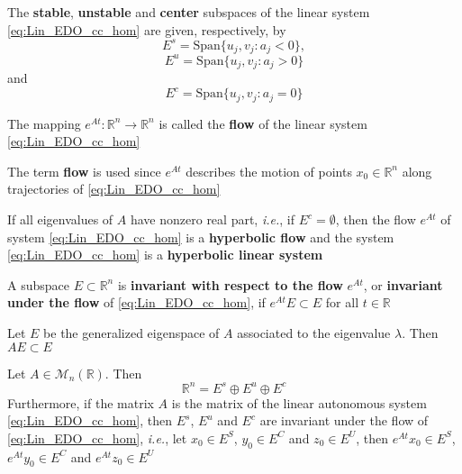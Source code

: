 \documentclass{beamer}
\def\ie{\emph{i.e.}}
\def\defword#1{\textbf{#1}}
\begin{document}
\begin{frame}
\begin{definition}
The \defword{stable}, \defword{unstable} and \defword{center} subspaces of the linear system \eqref{eq:Lin_EDO_cc_hom} are given, respectively, by
\[
E^s=\textrm{Span}\{u_j,v_j:a_j<0\},
\]
\[
E^u=\textrm{Span}\{u_j,v_j:a_j>0\}
\]
and
\[
E^c=\textrm{Span}\{u_j,v_j:a_j=0\}
\]
\end{definition}
\end{frame}

\begin{frame}
\begin{definition}
The mapping $e^{At}:\mathbb{R}^n\to\mathbb{R}^n$ is called the \defword{flow} of the linear system \eqref{eq:Lin_EDO_cc_hom}
\end{definition}
The term \defword{flow} is used since $e^{At}$ describes the motion of points $x_0\in\mathbb{R}^n$ along trajectories of \eqref{eq:Lin_EDO_cc_hom}
\begin{definition}
If all eigenvalues of $A$ have nonzero real part, \ie, if $E^c=\emptyset$, then the flow $e^{At}$ of system \eqref{eq:Lin_EDO_cc_hom} is a \defword{hyperbolic flow} and the system \eqref{eq:Lin_EDO_cc_hom} is a \defword{hyperbolic linear system}
\end{definition}
\begin{definition}
A subspace $E\subset\mathbb{R}^n$ is \defword{invariant with respect to the flow} $e^{At}$, or \defword{invariant under the flow} of \eqref{eq:Lin_EDO_cc_hom}, if $e^{At}E\subset E$ for all $t\in\mathbb{R}$
\end{definition}
\end{frame}

\begin{frame}
\begin{theorem}
Let $E$ be the generalized eigenspace of $A$ associated to the eigenvalue $\lambda$. Then $AE\subset E$
\end{theorem}

\begin{theorem}
Let $A\in\mathcal{M}_n(\mathbb{R})$. Then
\[
\mathbb{R}^n=E^s\oplus E^u\oplus E^c
\]
Furthermore, if the matrix $A$ is the matrix of the linear autonomous system \eqref{eq:Lin_EDO_cc_hom}, then $E^s$, $E^u$ and $E^c$ are invariant under the flow of \eqref{eq:Lin_EDO_cc_hom}, \ie, let
$x_0\in E^S$, $y_0\in E^C$ and $z_0\in E^U$, then $e^{At}x_0\in E^S$,
$e^{At}y_0\in E^C$ and $e^{At}z_0\in E^U$
\end{theorem}
\end{frame}
\end{document}

